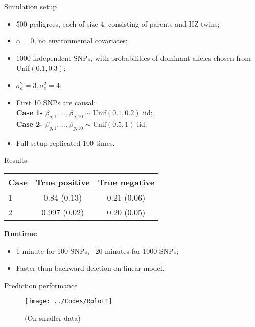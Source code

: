 \documentclass[handout,10pt]{beamer}
\begin{document}
\begin{frame}{Simulation setup}
\begin{itemize}
\item 500 pedigrees, each of size 4: consisting of parents and HZ twins;
\item $\alpha = 0$, no environmental covariates;
\item 1000 independent SNPs, with probabilities of dominant alleles chosen from Unif$(0.1,0.3)$;
\item $\sigma^2_a = 3, \sigma^2_e = 4$;
\item First 10 SNPs are causal:\\
{\bf Case 1-} $\beta_{g,1},...,\beta_{g,10} \sim \text{Unif}(0.1, 0.2)$ iid;\\
{\bf Case 2-} $\beta_{g,1},...,\beta_{g,10} \sim \text{Unif}(0.5, 1)$ iid.

\item Full setup replicated 100 times.
\end{itemize}
\end{frame}

\begin{frame}{Results}
\begin{table}
\centering
\begin{tabular}{l|c|c}
\textbf{Case} & \textbf{True positive }& \textbf{True negative} \\\hline
1 & 0.84 (0.13) & 0.21 (0.06) \\
2 & 0.997 (0.02) & 0.20 (0.05)\\\hline
\end{tabular}
\end{table}

\textbf{Runtime:}
\begin{itemize}
\item 1 minute for 100 SNPs, ~20 minutes for 1000 SNPs;
\item Faster than backward deletion on linear model.
\end{itemize}
\end{frame}

\begin{frame}{Prediction performance}
\begin{figure}
\centering
\texttt{[image: ../Codes/Rplot1]}
\caption*{(On smaller data)}
\end{figure}
\end{frame}

\end{document}
